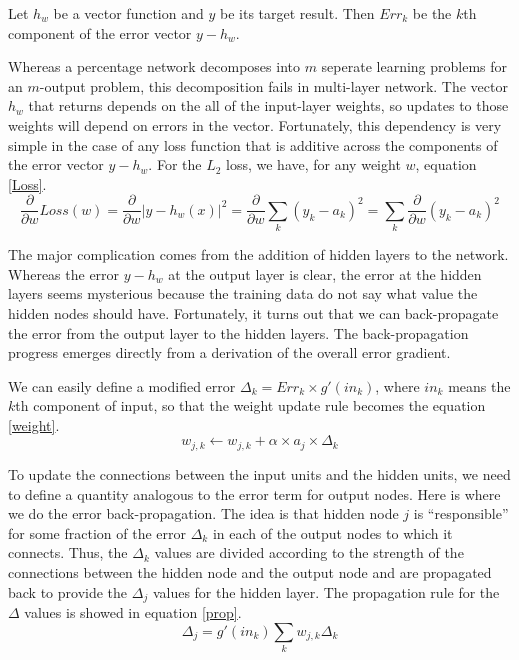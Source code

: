 \documentclass{mcmthesis}
\begin{document}
	Let $h_{w}$ be a vector function and $y$ be its target result. Then $Err_{k}$ be the $k$th component of the error vector $y-h_{w}$.
	
	Whereas a percentage network decomposes into $m$ seperate learning problems for an $m$-output problem, this decomposition fails in multi-layer network. The vector $h_{w}$ that returns depends on the all of the input-layer weights, so updates to those weights will depend on errors in the vector. Fortunately, this dependency is very simple in the case of any loss function that is additive across the components of the error vector $y-h_{w}$. For the $L_{2}$ loss, we have, for any weight $w$,  equation \ref{Loss}.
	\begin{equation}
	\label{Loss}
	   \frac{\partial }{\partial w}Loss\left ( w \right )=\frac{\partial }{\partial w}\left | y-h_{w}\left ( x \right ) \right |^{2}
   =\frac{\partial }{\partial w}\sum_{k}\left ( y_{k}-a_{k} \right )^{2}=\sum_{k}\frac{\partial }{\partial w}\left ( y_{k}-a_{k} \right )^{2} 
	\end{equation}

	The major complication comes from the addition of hidden layers to the network. Whereas the error ${y-h_{w}}$ at the output layer is clear, the error at the hidden layers seems mysterious because the training data do not say what value the hidden nodes should have. Fortunately, it turns out that we can back-propagate the error from the output layer to the hidden layers. The back-propagation progress emerges directly from a derivation of the overall error gradient.
	
	We can easily define a modified error $\Delta _{k}=Err _{k}\times g{}'\left ( in_{k} \right )$, where $in_{k}$ means the $k$th component of input, so that the weight update rule becomes the equation \ref{weight}.
	\begin{equation}
       \label{weight}
	    w_{j,k}\leftarrow w_{j,k}+\alpha \times a_{j} \times\Delta _{k}
	\end{equation}
	
	To update the connections between the input units and the hidden units, we need to define a quantity analogous to the error term for output nodes. Here is where we do the error back-propagation. The idea is that hidden node $j$ is ``responsible'' for some fraction of the error $\Delta _{k}$ in each of the output nodes to which it connects. Thus, the $\Delta _{k}$ values are divided according to the strength of the connections between the hidden node and the output node and are propagated back to provide the $\Delta_{j}$ values for the hidden layer. The propagation rule for the $\Delta$ values is showed in equation \ref{prop}.
	\begin{equation}
        \label{prop}
	    \Delta_{j} = g{}'\left ( in_{k} \right)\sum_{k}w_{j,k}\Delta_{k}
	\end{equation}
\end{document}
